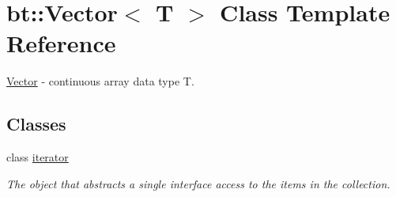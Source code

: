 \hypertarget{classbt_1_1_vector}{\section{bt\-:\-:Vector$<$ T $>$ Class Template Reference}
\label{classbt_1_1_vector}
}


\hyperlink{classbt_1_1_vector}{Vector} -\/ continuous array data type T.  


\subsection*{Classes}
\begin{DoxyCompactItemize}
\item 
class \hyperlink{classbt_1_1_vector_1_1iterator}{iterator}
\begin{DoxyCompactList}\small\item\em The object that abstracts a single interface access to the items in the collection. \end{DoxyCompactList}\end{DoxyCompactItemize}
